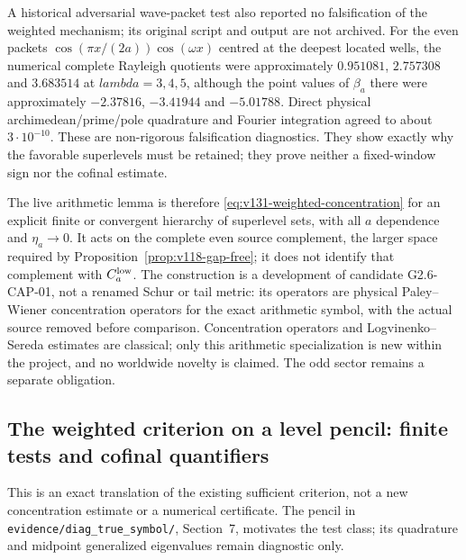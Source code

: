 \documentclass[11pt]{article}
\def\lambda{lambda}%
\theoremstyle{remark}
\begin{document}
A historical adversarial wave-packet test also reported no falsification
of the weighted mechanism; its original script and output are not archived.  For the even packets
$\cos(\pi x/(2a))\cos(\omega x)$ centred at the deepest located wells,
the numerical complete Rayleigh quotients were approximately
$0.951081$, $2.757308$ and $3.683514$ at $\lambda=3,4,5$, although the
point values of $\beta_a$ there were approximately $-2.37816$,
$-3.41944$ and $-5.01788$.  Direct physical archimedean/prime/pole
quadrature and Fourier integration agreed to about $3\cdot10^{-10}$.
These are non-rigorous falsification diagnostics.  They show exactly
why the favorable superlevels must be retained; they prove neither a
fixed-window sign nor the cofinal estimate.

The live arithmetic lemma is therefore
\eqref{eq:v131-weighted-concentration} for an explicit finite or
convergent hierarchy of superlevel sets, with all $a$ dependence and
$\eta_a\to0$.  It acts on the complete even source complement, the
larger space required by Proposition~\ref{prop:v118-gap-free}; it does
not identify that complement with $C_a^{\rm low}$.  The construction
is a development of candidate G2.6-CAP-01, not a renamed Schur or tail
metric: its operators are physical Paley--Wiener concentration
operators for the exact arithmetic symbol, with the actual source
removed before comparison.  Concentration operators and
Logvinenko--Sereda estimates are classical; only this arithmetic
specialization is new within the project, and no worldwide novelty is
claimed.  The odd sector remains a separate obligation.

\subsection{The weighted criterion on a level pencil: finite tests and cofinal quantifiers}

This is an exact translation of the existing sufficient criterion, not a
new concentration estimate or a numerical certificate. The pencil in
\texttt{evidence/diag\_true\_symbol/}, Section~7, motivates the test class;
its quadrature and midpoint generalized eigenvalues remain diagnostic only.
\end{document}
